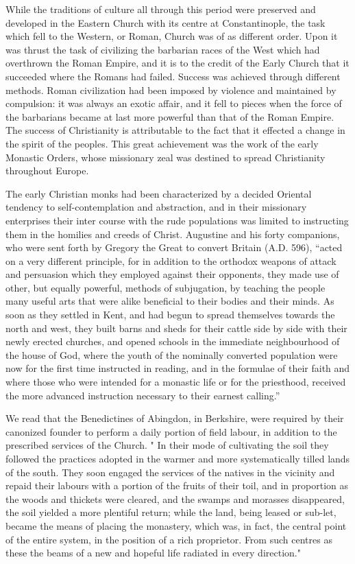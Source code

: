 \documentclass{book}
\begin{document}
While the traditions of culture all through this period were preserved and developed in the Eastern Church with its centre at Constantinople, the task which fell to the Western, or Roman, Church was of as different order. Upon it was thrust the task of civilizing the barbarian races of the West which had overthrown the Roman Empire, and it is to the credit of the Early Church that it succeeded where the Romans had failed. Success was achieved through different methods. Roman civilization had been imposed by violence and maintained by compulsion: it was always an exotic affair, and it fell to pieces when the force of the barbarians became at last more powerful than that of the Roman Empire. The success of Christianity is attributable to the fact that it effected a change in the spirit of the peoples. This great achievement was the work of the early Monastic Orders, whose missionary zeal was destined to spread Christianity throughout Europe.

The early Christian monks had been characterized by a decided Oriental tendency to self-contemplation and abstraction, and in their missionary enterprises their inter course with the rude populations was limited to instructing them in the homilies and creeds of Christ. Augustine and his forty companions, who were sent forth by Gregory the Great to convert Britain (A.D. 596), “acted on a very different principle, for in addition to the orthodox weapons of attack and persuasion which they employed against their opponents, they made use of other, but equally powerful, methods of subjugation, by teaching the people many useful arts that were alike beneficial to their bodies and their minds. As soon as they settled in Kent, and had begun to spread themselves towards the north and west, they built barns and sheds for their cattle side by side with their newly erected churches, and opened schools in the immediate neighbourhood of the house of God, where the youth of the nominally converted population were now for the first time instructed in reading, and in the formulae of their faith and where those who were intended for a monastic life or for the priesthood, received the more advanced instruction necessary to their earnest calling.”\footnotemark[5]

We read that the Benedictines of Abingdon, in Berkshire, were required by their canonized founder to perform a daily portion of field labour, in addition to the prescribed services of the Church. " In their mode of cultivating the soil they followed the practices adopted in the warmer and more systematically tilled lands of the south. They soon engaged the services of the natives in the vicinity and repaid their labours with a portion of the fruits of their toil, and in proportion as the woods and thickets were cleared, and the swamps and morasses disappeared, the soil yielded a more plentiful return; while the land, being leased or sub-let, became the means of placing the monastery, which was, in fact, the central point of the entire system, in the position of a rich proprietor. From such centres as these the beams of a new and hopeful life radiated in every direction."\footnotemark[6]
\end{document}
